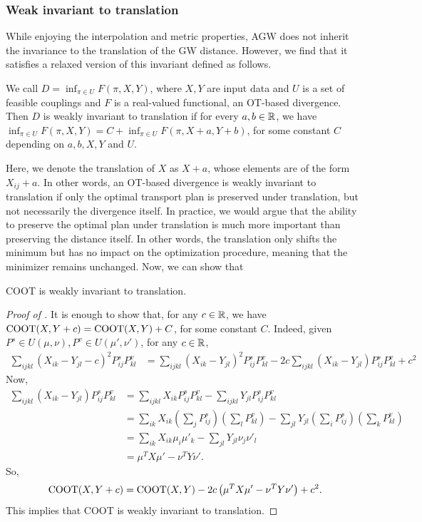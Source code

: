 \subsubsection{Weak invariant to translation}
While enjoying the interpolation and metric properties, AGW does not inherit the invariance
to the translation of the GW distance. However, we find that it satisfies a relaxed version
of this invariant defined as follows.
\begin{definition}
    We call $D = \inf_{\pi \in U} F(\pi, X, Y)$, where $X, Y$ are input data and $U$
    is a set of feasible couplings and $F$ is a real-valued functional, an OT-based divergence.
    Then $D$ is weakly invariant to translation if for every $a, b \in \mathbb R$, we have
    $\inf_{\pi \in U} F(\pi, X, Y) = C + \inf_{\pi \in U} F(\pi, X + a, Y+b)$,
    for some constant $C$ depending on $a, b, X, Y$ and $U$.
\end{definition}
Here, we denote the translation of $X$ as $X + a$, whose elements are of the form $X_{ij} + a$.
In other words, an OT-based divergence is weakly invariant to translation if only
the optimal transport plan is preserved under translation, but not necessarily the divergence itself.
In practice, we would argue that the ability to preserve the optimal plan under translation
is much more important than preserving the distance itself. In other words,
the translation only shifts the minimum but has no impact on the optimization procedure,
meaning that the minimizer remains unchanged. Now, we can show that
\begin{corollary}
\label{prop:coot_invariant}
    COOT is weakly invariant to translation.
\end{corollary}
\begin{proof}[Proof of ]
It is enough to show that, for any $c \in \mathbb R$, we have $\text{COOT}(X, Y + c) = \text{COOT}(X, Y) + C$,
for some constant $C$. Indeed, given $P^s \in U(\mu, \nu), P^v \in U(\mu', \nu')$,
for any $c \in \mathbb R$,
\begin{align}
    \sum_{ijkl} (X_{ik} - Y_{jl} - c)^2 P^s_{ij} P^v_{kl}
    &= \sum_{ijkl} (X_{ik} - Y_{jl})^2 P^s_{ij} P^v_{kl}
    - 2c \sum_{ijkl} (X_{ik} - Y_{jl}) P^s_{ij} P^v_{kl} + c^2
\end{align}
Now,
\begin{align}
    \sum_{ijkl} (X_{ik} - Y_{jl}) P^s_{ij} P^v_{kl}
    &= \sum_{ijkl} X_{ik} P^s_{ij} P^v_{kl} - \sum_{ijkl} Y_{jl} P^s_{ij} P^v_{kl} \\
    &= \sum_{ik} X_{ik} \left( \sum_j P^s_{ij} \right) \left( \sum_l P^v_{kl} \right)
    - \sum_{jl} Y_{jl} \left( \sum_i P^s_{ij} \right) \left( \sum_k P^v_{kl} \right) \\
    &= \sum_{ik} X_{ik} \mu_i \mu'_k - \sum_{jl} Y_{jl} \nu_j \nu'_l \\
    &= \mu ^T X \mu' - \nu ^T Y \nu'.
\end{align}
So,
\begin{align}
    \text{COOT}(X, Y + c) = \text{COOT}(X, Y) - 2 c \left( \mu^T X \mu' - \nu^T Y \nu' \right) + c^2.
\end{align}
This implies that COOT is weakly invariant to translation.
\end{proof}

